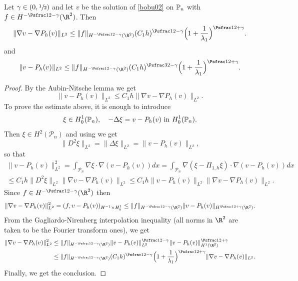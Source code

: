 \begin{lemma}\label{bobu36.l}
Let $\gamma \in (0, \sfrac 12)$ and let $v$ be the solution of \eqref{bobu02} on $\Bbb P_n$ with $f \in H^{-\Psfrac 12 -\gamma} (\R^2)$. Then
\begin{equation}\label{bobu36}
\|\nabla v- \nabla P_h(v)\|_{L^2} \le \|f\|_{H^{-\Psfrac 12 -\gamma} (\R^2)} (C_1 h)^{\Psfrac 12 -\gamma}\Bigl(1+\frac {1}{\lambda_1}\Bigr)^{\Psfrac 12 +\gamma}. \end{equation}
and
\begin{equation}\label{bobu36.2}
\| v- P_h(v)\|_{L^2} \le \|f\|_{H^{-\Psfrac 12 -\gamma} (\R^2)} (C_1 h)^{\Psfrac 32 -\gamma}\Bigl(1+\frac {1}{\lambda_1}\Bigr)^{\Psfrac 12 +\gamma}. \end{equation}
\end{lemma}
\begin{proof}
By the Aubin-Nitsche lemma \cite[p.\,136]{CiarletBook} we get
\[
\|v-P_h(v)\|_{L^2} \le C_1h \|\nabla v-\nabla P_h(v)\|_{L^2}.
\]
To prove the estimate above, it is enough to introduce
\[
\xi \in H^1_0(\Bbb P_n),\quad -\Delta \xi = v-P_h(v) \mbox{ in } H^1_0(\Bbb P_n).
\]
Then $\xi \in H^2(\mathcal P_n)$ and using \cite[Th.\,4.3.1.4]{grisvard} we get
\[
\|D^2 \xi\|_{L^2} = \|\Delta \xi\|_{L^2} = \|v-P_h(v)\|_{L^2},
\]
so that
\vspace*{-5pt}
\begin{multline*}
\|v-P_h(v)\|_{L^2}^2 = \int_{\mathcal P_n} \nabla \xi\cdot \nabla (v-P_h(v)) dx = \int_{\mathcal P_n} \nabla (\xi-\Pi_{1,h} \xi)\cdot \nabla (v-P_h(v)) dx\\
\le C_1h \|D^2 \xi\|_{L^2} \|\nabla v-\nabla P_h(v) \|_{L^2}\le C_1h \|v-P_h(v) \|_{L^2} \|\nabla v-\nabla P_h(v) \|_{L^2}.
\end{multline*}
Since $f \in H^{-\Psfrac 12 -\gamma} (\R^2)$ then
\[
\|\nabla v-\nabla P_h(v)\|_{L^2}^2= (f, v-P_h(v))_{H^{-1}\times H^1_0} \le \|f\|_{H^{-\Psfrac 12 -\gamma} (\R^2)}\|v-P_h(v)\|_{H^{\Psfrac 12 +\gamma }(\R^2)}.
\]
From the Gagliardo-Nirenberg interpolation inequality (all norms in $\R^2$ are taken to be the Fourier transform ones), we get
\begin{align*}\|\nabla v-\nabla P_h(v)\|_{L^2}^2 & \le \|f\|_{H^{-\Psfrac 12 -\gamma} (\R^2)}\|v-P_h(v)\|_{L^2}^{\Psfrac 12 -\gamma}\|v-P_h(v) \|_{H^1(\R^2)}^{\Psfrac 12 +\gamma} \\
& \le \|f\|_{H^{-\Psfrac 12 -\gamma} (\R^2)} (C_1 h)^{\Psfrac 12 -\gamma}\Bigl(1+\frac {1}{\lambda_1}\Bigr)^{\Psfrac 12 +\gamma} \|\nabla v-\nabla P_h(v)\|_{L^2}.
\end{align*}
Finally, we get the conclusion.
\end{proof}

